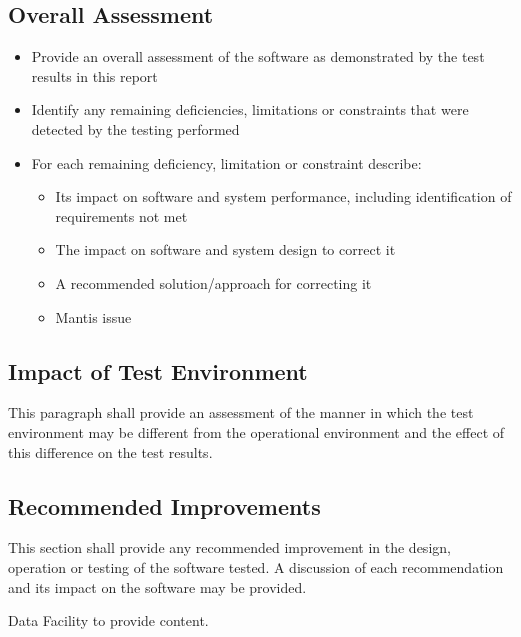 \documentclass[DM,lsstdraft,STR,toc]{lsstdoc}
\begin{document}
\subsection{Overall Assessment \label{sect:overallassessment}}
\begin{itemize}
\item Provide an overall assessment of the software as demonstrated by the test results in this report
\item Identify any remaining deficiencies, limitations or constraints that were detected by the testing performed
\item For each remaining deficiency, limitation or constraint describe:
\begin{itemize}
\item Its impact on software and system performance, including identification of requirements not met
\item The impact on software and system design to correct it
\item A recommended solution/approach for correcting it
\item Mantis issue
\end{itemize}
\end{itemize}

\subsection{Impact of Test Environment \label{sect:impact}}
This paragraph shall provide an assessment of the manner in which the test environment may be different from the
operational environment and the effect of this difference on the test results.

\subsection{Recommended Improvements \label{sect:recommendations}}
This section shall provide any recommended improvement in the design, operation or testing of the software tested. A discussion
of each recommendation and its impact on the software may be provided.

\begin{note}
Data Facility to provide content.
\end{note}
\end{document}
